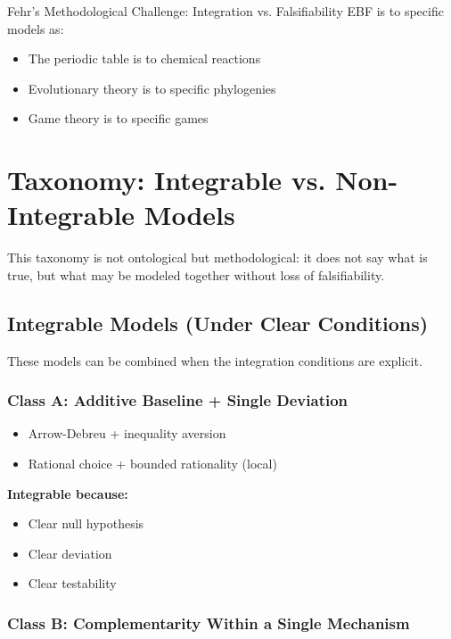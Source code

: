 \begin{chapter}{Fehr's Methodological Challenge: Integration vs. Falsifiability}
EBF is to specific models as:
\begin{itemize}[noitemsep]
    \item The periodic table is to chemical reactions
    \item Evolutionary theory is to specific phylogenies
    \item Game theory is to specific games
\end{itemize}


\section{Taxonomy: Integrable vs. Non-Integrable Models}
\label{sec:taxonomy}

This taxonomy is not ontological but methodological: it does not say what is true,
but what may be modeled together without loss of falsifiability.

\subsection{Integrable Models (Under Clear Conditions)}

These models can be combined when the integration conditions are explicit.

\subsubsection{Class A: Additive Baseline + Single Deviation}

\begin{itemize}[noitemsep]
    \item Arrow-Debreu + inequality aversion
    \item Rational choice + bounded rationality (local)
\end{itemize}

\textbf{Integrable because:}
\begin{itemize}[noitemsep]
    \item Clear null hypothesis
    \item Clear deviation
    \item Clear testability
\end{itemize}

\subsubsection{Class B: Complementarity Within a Single Mechanism}


\end{chapter}
